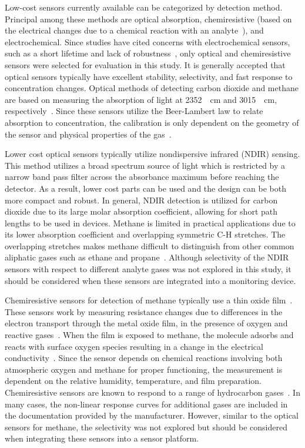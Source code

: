 \documentclass[times]{joehreview}
\begin{document}
	Low-cost sensors currently available can be categorized by detection method.  Principal among these methods are optical absorption, chemiresistive (based on the electrical changes due to a chemical reaction with an analyte~\cite{wetchakun_semiconducting_2011}), and electrochemical.  Since studies have cited concerns with electrochemical sensors, such as a short lifetime and lack of robustness~\cite{neri_first_2015}, only optical and chemiresistive sensors were selected for evaluation in this study.  It is generally accepted that optical sensors typically have excellent stability, selectivity, and fast response to concentration changes.  Optical methods of detecting carbon dioxide and methane are based on measuring the absorption of light at \SI{2352}{\per\centi\meter} and \SI{3015}{\per\centi\meter}, respectively~\cite{frodl_high-precision_2006,zhu_one_2012}.  Since these sensors utilize the Beer-Lambert law to relate absorption to concentration, the calibration is only dependent on the geometry of the sensor and physical properties of the gas~\cite{bacsik_ftir_2004}.  
	
	Lower cost optical sensors typically utilize nondispersive infrared (NDIR) sensing.  This method utilizes a broad spectrum source of light which is restricted by a narrow band pass filter across the absorbance maximum before reaching the detector.  As a result, lower cost parts can be used and the design can be both more compact and robust.  In general, NDIR detection is utilized for carbon dioxide due to its large molar absorption coefficient, allowing for short path lengths to be used in devices.  Methane is limited in practical applications due to its lower absorption coefficient and overlapping symmetric C-H stretches.  The overlapping stretches makes methane difficult to distinguish from other common aliphatic gases such as ethane and propane~\cite{coblentz_society_inc._evaluated_????}.  Although selectivity of the NDIR sensors with respect to different analyte gases was not explored in this study, it should be considered when these sensors are integrated into a monitoring device. 
		
	Chemiresistive sensors for detection of methane typically use a thin oxide film~\cite{neri_first_2015}.  These sensors work by measuring resistance changes due to differences in the electron transport through the metal oxide film, in the presence of oxygen and reactive gases~\cite{albert_cross-reactive_2000}.  When the film is exposed to methane, the molecule adsorbs and reacts with surface oxygen species resulting in a change in the electrical conductivity~\cite{wang_metal_2010,prudenziati_thick-film_1986}.  Since the sensor depends on chemical reactions involving both atmospheric oxygen and methane for proper functioning, the measurement is dependent on the relative humidity, temperature, and film preparation.  Chemiresistive sensors are known to respond to a range of hydrocarbon gases~\cite{sekhar_development_2016}. In many cases, the non-linear response curves for additional gases are included in the documentation provided by the manufacturer.  However, similar to the optical sensors for methane, the selectivity was not explored but should be considered when integrating these sensors into a sensor platform.
	
\end{document}
